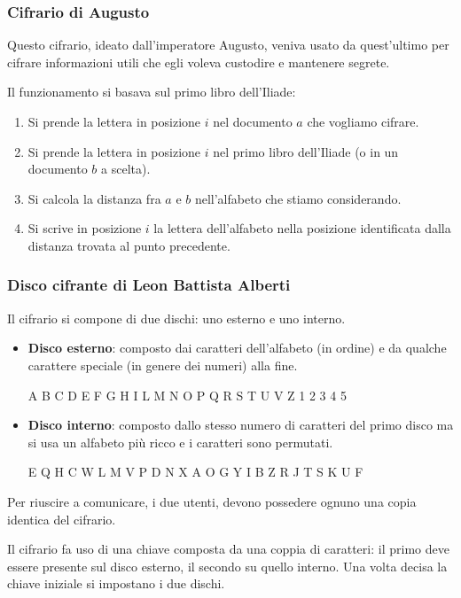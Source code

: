 \subsubsection{Cifrario di Augusto}
Questo cifrario, ideato dall'imperatore Augusto, veniva usato da quest'ultimo per cifrare informazioni utili che egli
voleva custodire e mantenere segrete.

Il funzionamento si basava sul primo libro dell'Iliade:
\begin{enumerate}
	\item Si prende la lettera in posizione $i$ nel documento $a$ che vogliamo cifrare.
	\item Si prende la lettera in posizione $i$ nel primo libro dell'Iliade (o in un documento $b$ a scelta).
	\item Si calcola la distanza fra $a$ e $b$ nell'alfabeto che stiamo considerando.
	\item Si scrive in posizione $i$ la lettera dell'alfabeto nella posizione identificata dalla distanza trovata al
	      punto precedente.
\end{enumerate}

\subsubsection{Disco cifrante di Leon Battista Alberti}
Il cifrario si compone di due dischi: uno esterno e uno interno.
\begin{itemize}
	\item \textbf{Disco esterno}: composto dai caratteri dell'alfabeto (in ordine) e da qualche carattere speciale (in
	      genere dei numeri) alla fine.
	      \begin{center}
		      A B C D E F G H I L M N O P Q R S T U V Z 1 2 3 4 5
	      \end{center}
	\item \textbf{Disco interno}: composto dallo stesso numero di caratteri del primo disco ma si usa un alfabeto
	      pi\`u ricco e i caratteri sono permutati.
	      \begin{center}
		      E Q H C W L M V P D N X A O G Y I B Z R J T S K U F
	      \end{center}
\end{itemize}
Per riuscire a comunicare, i due utenti, devono possedere ognuno una copia identica del cifrario.

Il cifrario fa uso di una chiave composta da una coppia di caratteri: il primo deve essere presente sul disco esterno,
il secondo su quello interno. Una volta decisa la chiave iniziale si impostano i due dischi.

